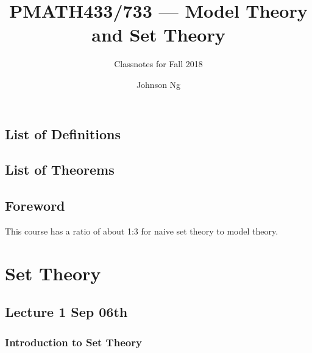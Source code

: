 \documentclass[notoc,notitlepage]{tufte-book}
\title{PMATH433/733 --- Model Theory and Set Theory}
\author{Johnson Ng}
\subtitle{Classnotes for Fall 2018}
\begin{document}
\hypersetup{pageanchor=false}
\maketitle
\hypersetup{pageanchor=true}
\begin{fullwidth}
\tableofcontents
\end{fullwidth}

\chapter*{\faBook \enspace List of Definitions}
\begin{fullwidth}
\end{fullwidth}

\chapter*{\faCoffee \enspace List of Theorems}
\begin{fullwidth}
\end{fullwidth}

\chapter*{Foreword}%
\label{chp:foreword}

This course has a ratio of about 1:3 for naive set theory to model theory.


\part{Set Theory}

\chapter{Lecture 1 Sep 06th}%
\label{chp:lecture_1_sep_06th}

\section{Introduction to Set Theory}%
\label{sec:introduction_to_set_theory}
\end{document}
